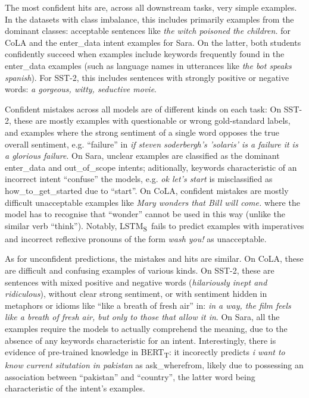 \documentclass[bsc,frontabs,singlespacing,parskip,deptreport]{infthesis}
\def\BERTT{BERT\textsubscript{T}}
\def\LSTMS{LSTM\textsubscript{S}}
\begin{document}
{{{      The most confident hits are, across all downstream tasks, very simple examples. In the datasets with class imbalance, this includes primarily examples from the dominant classes: acceptable sentences like \textit{the witch poisoned the children.} for CoLA and the enter\_data intent examples for Sara. On the latter, both students confidently succeed when examples include keywords frequently found in the enter\_data examples (such as language names in utterances like \textit{the bot speaks spanish}).
      For SST-2, this includes sentences with strongly positive or negative words: \textit{a gorgeous, witty, seductive movie}.
      
      Confident mistakes across all models are of different kinds on each task: On SST-2, these are mostly examples with questionable or wrong gold-standard labels, and examples where the strong sentiment of a single word opposes the true overall sentiment, e.g. ``failure'' in \textit{if steven soderbergh's 'solaris' is a failure it is a glorious failure}. On Sara, unclear examples are classified as the dominant enter\_data and out\_of\_scope intents; aditionally, keywords characteristic of an incorrect intent ``confuse'' the models, e.g. \textit{ok let's start} is misclassified as how\_to\_get\_started due to ``start''. On CoLA, confident mistakes are mostly difficult unacceptable examples like \textit{Mary wonders that Bill will come.} where the model has to recognise that ``wonder'' cannot be used in this way (unlike the similar verb ``think''). Notably, \LSTMS~fails to predict examples with imperatives and incorrect reflexive pronouns of the form \textit{wash you!} as unacceptable.

      As for unconfident predictions, the mistakes and hits are similar. On CoLA, these are difficult and confusing examples of various kinds. On SST-2, these are sentences with mixed positive and negative words (\textit{hilariously inept and ridiculous}), without clear strong sentiment, or with sentiment hidden in metaphors or idioms like ``like a breath of fresh air'' in: \textit{in a way, the film feels like a breath of fresh air, but only to those that allow it in}. On Sara, all the examples require the models to actually comprehend the meaning, due to the absence of any keywords characteristic for an intent. Interestingly, there is evidence of pre-trained knowledge in \BERTT: it incorectly predicts \textit{i want to know current situtation in pakistan} as ask\_wherefrom, likely due to possessing an association between ``pakistan'' and ``country'', the latter word being characteristic of the intent's examples.

}}}
\end{document}
